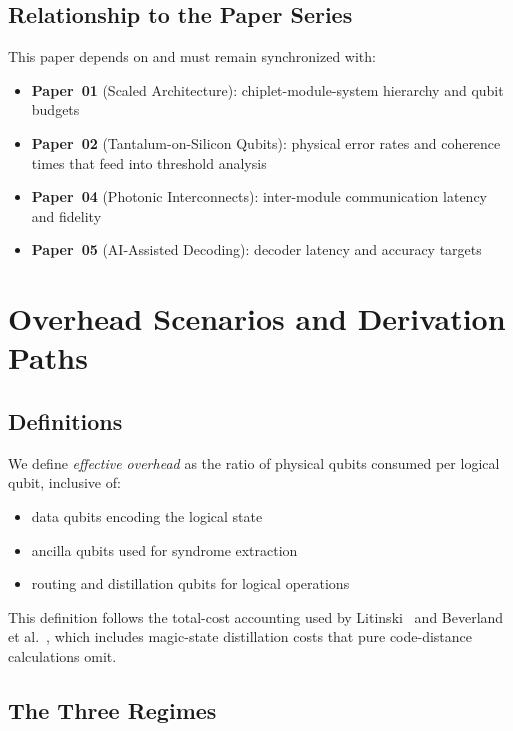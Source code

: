 \documentclass[conference]{IEEEtran}
\begin{document}
\subsection{Relationship to the Paper Series}

This paper depends on and must remain synchronized with:

\begin{itemize}
\item \textbf{Paper~01} (Scaled Architecture): chiplet-module-system hierarchy and qubit budgets
\item \textbf{Paper~02} (Tantalum-on-Silicon Qubits): physical error rates and coherence times that feed into threshold analysis
\item \textbf{Paper~04} (Photonic Interconnects): inter-module communication latency and fidelity
\item \textbf{Paper~05} (AI-Assisted Decoding): decoder latency and accuracy targets
\end{itemize}

\section{Overhead Scenarios and Derivation Paths}

\subsection{Definitions}

We define \emph{effective overhead} as the ratio of physical qubits consumed per logical qubit, inclusive of:

\begin{itemize}
\item data qubits encoding the logical state
\item ancilla qubits used for syndrome extraction
\item routing and distillation qubits for logical operations
\end{itemize}

This definition follows the total-cost accounting used by Litinski~\cite{litinski2019} and Beverland et al.~\cite{beverland2022}, which includes magic-state distillation costs that pure code-distance calculations omit.

\subsection{The Three Regimes}
\end{document}
